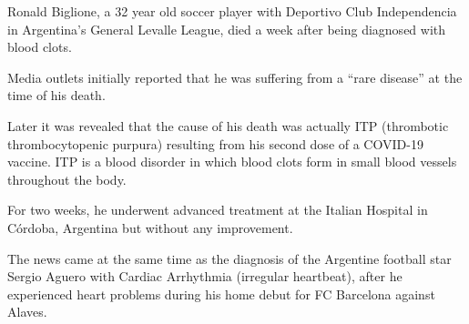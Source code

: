Ronald Biglione, a 32 year old soccer player with Deportivo Club Independencia
in Argentina’s General Levalle League, died a week after being diagnosed with
blood clots.

Media outlets initially reported that he was suffering from a “rare disease” at
the time of his death.

Later it was revealed that the cause of his death was actually ITP (thrombotic
thrombocytopenic purpura) resulting from his second dose of a COVID-19
vaccine. ITP is a blood disorder in which blood clots form in small blood
vessels throughout the body.

For two weeks, he underwent advanced treatment at the Italian Hospital in
Córdoba, Argentina but without any improvement.

The news came at the same time as the diagnosis of the Argentine football star
Sergio Aguero with Cardiac Arrhythmia (irregular heartbeat), after he
experienced heart problems during his home debut for FC Barcelona against
Alaves.
